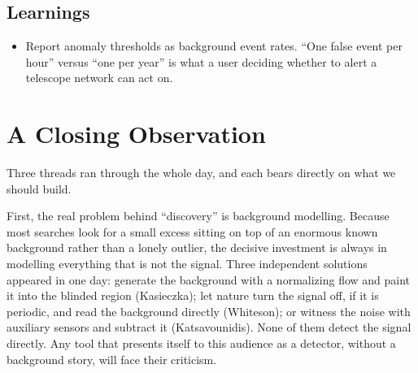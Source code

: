 \documentclass[11pt]{article}
\begin{document}
\subsection*{Learnings}
\begin{itemize}
    \item Report anomaly thresholds as background event rates. ``One false event per hour'' versus ``one per year'' is what a user deciding whether to alert a telescope network can act on. %
\end{itemize}

\section*{A Closing Observation}

Three threads ran through the whole day, and each bears directly on what we should build.

First, the real problem behind ``discovery'' is background modelling. Because most searches look for a small excess sitting on top of an enormous known background rather than a lonely outlier, the decisive investment is always in modelling everything that is not the signal. Three independent solutions appeared in one day: generate the background with a normalizing flow and paint it into the blinded region (Kasieczka); let nature turn the signal off, if it is periodic, and read the background directly (Whiteson); or witness the noise with auxiliary sensors and subtract it (Katsavounidis). None of them detect the signal directly. Any tool that presents itself to this audience as a detector, without a background story, will face their criticism.
\end{document}
